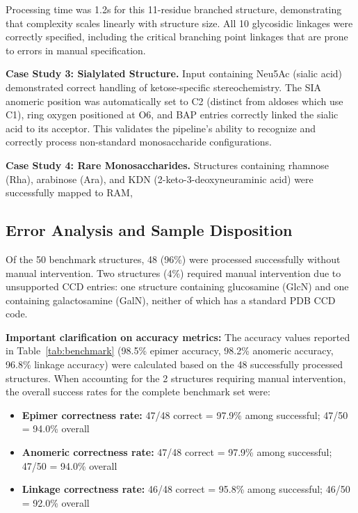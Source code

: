Processing time was 1.2s for this 11-residue branched structure, demonstrating that complexity scales linearly with structure size. All 10 glycosidic linkages were correctly specified, including the critical branching point linkages that are prone to errors in manual specification.

\textbf{Case Study 3: Sialylated Structure.} Input containing Neu5Ac (sialic acid) demonstrated correct handling of ketose-specific stereochemistry. The SIA anomeric position was automatically set to C2 (distinct from aldoses which use C1), ring oxygen positioned at O6, and BAP entries correctly linked the sialic acid to its acceptor. This validates the pipeline's ability to recognize and correctly process non-standard monosaccharide configurations.

\textbf{Case Study 4: Rare Monosaccharides.} Structures containing rhamnose (Rha), arabinose (Ara), and KDN (2-keto-3-deoxyneuraminic acid) were successfully mapped to RAM,

\subsection{Error Analysis and Sample Disposition}

Of the 50 benchmark structures, 48 (96\%) were processed successfully without manual intervention. Two structures (4\%) required manual intervention due to unsupported CCD entries: one structure containing glucosamine (GlcN) and one containing galactosamine (GalN), neither of which has a standard PDB CCD code.

\textbf{Important clarification on accuracy metrics:} The accuracy values reported in Table~\ref{tab:benchmark} (98.5\% epimer accuracy, 98.2\% anomeric accuracy, 96.8\% linkage accuracy) were calculated based on the 48 successfully processed structures. When accounting for the 2 structures requiring manual intervention, the overall success rates for the complete benchmark set were:
\begin{itemize}
\item \textbf{Epimer correctness rate:} 47/48 correct = 97.9\% among successful; 47/50 = 94.0\% overall
\item \textbf{Anomeric correctness rate:} 47/48 correct = 97.9\% among successful; 47/50 = 94.0\% overall  
\item \textbf{Linkage correctness rate:} 46/48 correct = 95.8\% among successful; 46/50 = 92.0\% overall
\end{itemize}

